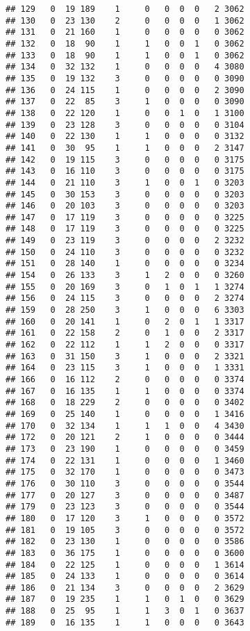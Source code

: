 \documentclass[
]{book}
\begin{document}
\begin{verbatim}
## 129   0  19 189    1     0   0  0  0   2 3062
## 130   0  23 130    2     0   0  0  0   1 3062
## 131   0  21 160    1     0   0  0  0   0 3062
## 132   0  18  90    1     1   0  0  1   0 3062
## 133   0  18  90    1     1   0  0  1   0 3062
## 134   0  32 132    1     0   0  0  0   4 3080
## 135   0  19 132    3     0   0  0  0   0 3090
## 136   0  24 115    1     0   0  0  0   2 3090
## 137   0  22  85    3     1   0  0  0   0 3090
## 138   0  22 120    1     0   0  1  0   1 3100
## 139   0  23 128    3     0   0  0  0   0 3104
## 140   0  22 130    1     1   0  0  0   0 3132
## 141   0  30  95    1     1   0  0  0   2 3147
## 142   0  19 115    3     0   0  0  0   0 3175
## 143   0  16 110    3     0   0  0  0   0 3175
## 144   0  21 110    3     1   0  0  1   0 3203
## 145   0  30 153    3     0   0  0  0   0 3203
## 146   0  20 103    3     0   0  0  0   0 3203
## 147   0  17 119    3     0   0  0  0   0 3225
## 148   0  17 119    3     0   0  0  0   0 3225
## 149   0  23 119    3     0   0  0  0   2 3232
## 150   0  24 110    3     0   0  0  0   0 3232
## 151   0  28 140    1     0   0  0  0   0 3234
## 154   0  26 133    3     1   2  0  0   0 3260
## 155   0  20 169    3     0   1  0  1   1 3274
## 156   0  24 115    3     0   0  0  0   2 3274
## 159   0  28 250    3     1   0  0  0   6 3303
## 160   0  20 141    1     0   2  0  1   1 3317
## 161   0  22 158    2     0   1  0  0   2 3317
## 162   0  22 112    1     1   2  0  0   0 3317
## 163   0  31 150    3     1   0  0  0   2 3321
## 164   0  23 115    3     1   0  0  0   1 3331
## 166   0  16 112    2     0   0  0  0   0 3374
## 167   0  16 135    1     1   0  0  0   0 3374
## 168   0  18 229    2     0   0  0  0   0 3402
## 169   0  25 140    1     0   0  0  0   1 3416
## 170   0  32 134    1     1   1  0  0   4 3430
## 172   0  20 121    2     1   0  0  0   0 3444
## 173   0  23 190    1     0   0  0  0   0 3459
## 174   0  22 131    1     0   0  0  0   1 3460
## 175   0  32 170    1     0   0  0  0   0 3473
## 176   0  30 110    3     0   0  0  0   0 3544
## 177   0  20 127    3     0   0  0  0   0 3487
## 179   0  23 123    3     0   0  0  0   0 3544
## 180   0  17 120    3     1   0  0  0   0 3572
## 181   0  19 105    3     0   0  0  0   0 3572
## 182   0  23 130    1     0   0  0  0   0 3586
## 183   0  36 175    1     0   0  0  0   0 3600
## 184   0  22 125    1     0   0  0  0   1 3614
## 185   0  24 133    1     0   0  0  0   0 3614
## 186   0  21 134    3     0   0  0  0   2 3629
## 187   0  19 235    1     1   0  1  0   0 3629
## 188   0  25  95    1     1   3  0  1   0 3637
## 189   0  16 135    1     1   0  0  0   0 3643

\end{verbatim}
\end{document}

